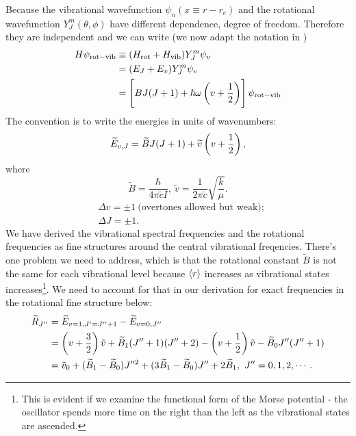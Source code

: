 Because the vibrational wavefunction $\psi_n(x\equiv r-r_e)$ and the rotational 
wavefunction $Y^m_J(\theta,\phi)$ have different dependence, \ie degree of 
freedom. Therefore they are independent and we can write (we now adapt the notation in )
\begin{equation}
\begin{aligned}
H\psi_{\mathrm{rot-vib}}&\equiv(H_{\mathrm{rot}}+H_{\mathrm{vib}})Y^m_J\psi_v\\
&=(E_J+E_v)Y^m_J\psi_v\\
&=\left[BJ(J+1)+\hbar\omega\left(v+\frac{1}{2}\right)\right]\psi_{\mathrm{rot-vib}}
\end{aligned}
\end{equation}
The convention is to write the energies in units of wavenumbers:
\begin{equation}
\widetilde{E}_{v,J}=\widetilde{B}J(J+1)+\widetilde{v}\left(v+\frac{1}{2}\right), 
\end{equation}
where 
\begin{equation}
\widetilde{B}=\frac{\hbar}{4\pi\widetilde{c}I},\ \widetilde{v}=\frac{1}{2\pi \widetilde{c}}\sqrt{\frac{k}{\mu}}.
\end{equation}
\begin{equation}
\begin{aligned}
&\Delta v=\pm1\ \text{(overtones allowed but weak)};\\
&\Delta J=\pm1.
\end{aligned}
\end{equation}
We have derived the vibrational spectral frequencies and the rotational frequencies as fine structures around the central vibrational freqencies. There's one problem we need to address, which is that the rotational constant $\widetilde{B}$ is not the same for each vibrational level because $\langle r \rangle $ increases as vibrational states increases\footnote{This is evident if we examine the functional form of the Morse potential - the oscillator spends more time on the right than the left as the vibrational states are ascended.}. We need to account for that in our derivation for exact frequencies in the rotational fine structure below: 
\begin{equation}
\begin{aligned}
\widetilde{R}_{J''}&=\widetilde{E}_{v=1,J'=J''+1}-\widetilde{E}_{v=0,J''}\\
&=\left(v+\frac{3}{2} \right)\tilde{v}+\widetilde{B}_1(J''+1)(J''+2)-\left(v+\frac{1}{2} \right)\tilde{v}-\widetilde{B}_0J''(J''+1)\\
&=\tilde{v}_0+(\widetilde{B}_1-\widetilde{B}_0)J''^2+(3\widetilde{B}_1-\widetilde{B}_0)J''+2\widetilde{B}_1 ,\ J''=0,1,2,\cdots. 
\end{aligned}
\end{equation}

